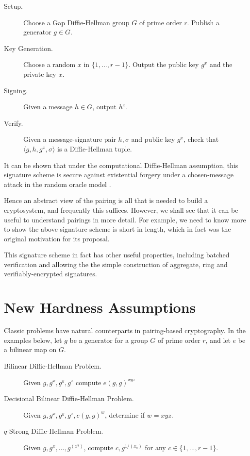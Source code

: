 \begin{description}
\item[Setup.]
Choose a Gap Diffie-Hellman group $G$ of prime order $r$.
Publish a generator $g \in G$.

\item[Key Generation.]
Choose a random $x$ in $\{1,...,r-1\}$. Output
the public key $g^x$ and the private key $x$.

\item[Signing.]
Given a message $h \in G$, output $h^x$.

\item[Verify.]
Given a message-signature pair $h, \sigma$ and public key $g^x$,
check that $\langle{ g, h, g^x, \sigma}\rangle$ is a Diffie-Hellman tuple.
\end{description}

It can be shown that under the computational Diffie-Hellman assumption,
this signature scheme is secure against existential
forgery under a chosen-message attack in the random oracle model \cite{bls}.

Hence an abstract view of the pairing is all that is needed to build a
cryptosystem, and frequently this suffices. However,
we shall see that it can be useful to understand pairings in more detail.
For example, we need to know more to show the above signature scheme is
short in length, which in fact was the original motivation for its proposal.

This signature scheme in fact has other useful properties, including
batched verification and allowing the
the simple construction of aggregate, ring and verifiably-encrypted
signatures\cite{bgls}.

\section{New Hardness Assumptions}

Classic problems have natural counterparts in pairing-based
cryptography. In the examples below, let $g$ be a generator
for a group $G$ of prime order $r$, and let $e$ be a bilinear map
on $G$.

\begin{description}
\item [Bilinear Diffie-Hellman Problem.]
Given $g,g^x,g^y,g^z$ compute $e(g,g)^{xyz}$
\item [Decisional Bilinear Diffie-Hellman Problem.]
Given $g,g^x,g^y,g^z,e(g,g)^w$, determine if $w = x y z$.
\item [$q$-Strong Diffie-Hellman Problem.]
Given $g,g^x,...,g^{(x^q)}$, compute $c, g^{1/(x_c)}$
for any $c\in\{1,...,r-1\}$.
\end{description}


